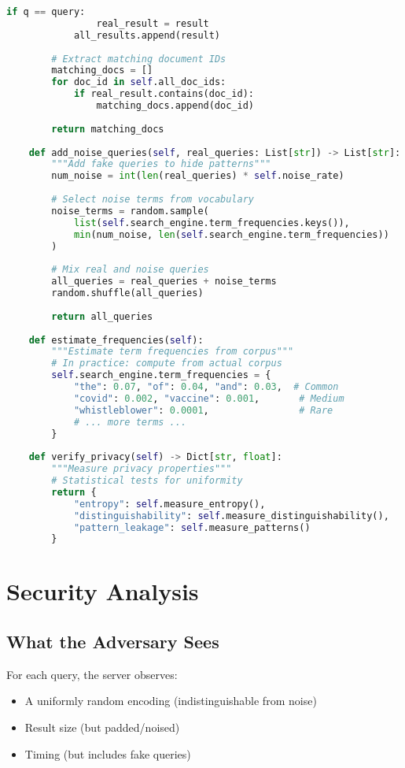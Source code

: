 \begin{lstlisting}[language=Python, caption={Complete oblivious document search}]
            if q == query:
                real_result = result
            all_results.append(result)
        
        # Extract matching document IDs
        matching_docs = []
        for doc_id in self.all_doc_ids:
            if real_result.contains(doc_id):
                matching_docs.append(doc_id)
        
        return matching_docs
    
    def add_noise_queries(self, real_queries: List[str]) -> List[str]:
        """Add fake queries to hide patterns"""
        num_noise = int(len(real_queries) * self.noise_rate)
        
        # Select noise terms from vocabulary
        noise_terms = random.sample(
            list(self.search_engine.term_frequencies.keys()),
            min(num_noise, len(self.search_engine.term_frequencies))
        )
        
        # Mix real and noise queries
        all_queries = real_queries + noise_terms
        random.shuffle(all_queries)
        
        return all_queries
    
    def estimate_frequencies(self):
        """Estimate term frequencies from corpus"""
        # In practice: compute from actual corpus
        self.search_engine.term_frequencies = {
            "the": 0.07, "of": 0.04, "and": 0.03,  # Common
            "covid": 0.002, "vaccine": 0.001,       # Medium
            "whistleblower": 0.0001,                # Rare
            # ... more terms ...
        }
    
    def verify_privacy(self) -> Dict[str, float]:
        """Measure privacy properties"""
        # Statistical tests for uniformity
        return {
            "entropy": self.measure_entropy(),
            "distinguishability": self.measure_distinguishability(),
            "pattern_leakage": self.measure_patterns()
        }
\end{lstlisting}

\section{Security Analysis}

\subsection{What the Adversary Sees}

For each query, the server observes:
\begin{itemize}
\item A uniformly random encoding (indistinguishable from noise)
\item Result size (but padded/noised)
\item Timing (but includes fake queries)
\end{itemize}

